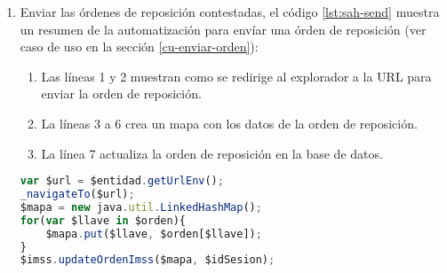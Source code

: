 \begin{enumerate}
	\item Enviar las órdenes de reposición contestadas, el código \ref{lst:sah-send} muestra un resumen de la automatización para envíar una órden de reposición (ver caso de uso en la sección \ref{cu-enviar-orden}):
	\begin{enumerate}
		\item Las líneas 1 y 2 muestran como se redirige al explorador a la URL para enviar la orden de reposición.
		\item La líneas 3 a 6 crea un mapa con los datos de la orden de reposición.
		\item La línea 7 actualiza la orden de reposición en la base de datos. 
	\end{enumerate}
	\begin{lstlisting}[language=Javascript, caption={Enviar orden de reposición.}, label={lst:sah-send}]
var $url = $entidad.getUrlEnv();
_navigateTo($url);
$mapa = new java.util.LinkedHashMap();
for(var $llave in $orden){
	$mapa.put($llave, $orden[$llave]);
}
$imss.updateOrdenImss($mapa, $idSesion);
	\end{lstlisting}
\end{enumerate}

